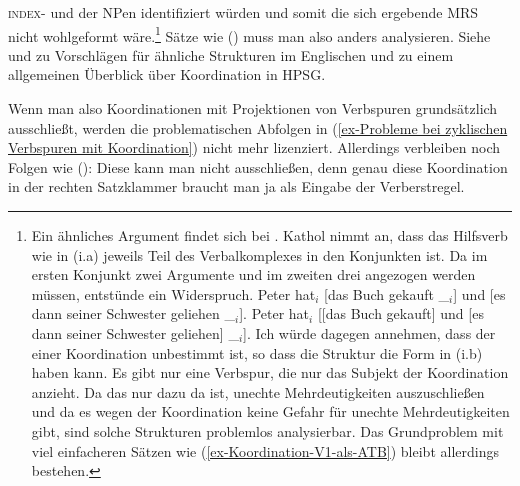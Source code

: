 \textsc{index}- und \ltopwe der NPen identifiziert würden und somit die sich ergebende MRS nicht wohlgeformt wäre.\footnote{%
  Ein ähnliches Argument findet sich bei \citet[75]{Kathol2000a}. Kathol nimmt an, dass das
  Hilfsverb wie in (i.a) jeweils Teil des Verbalkomplexes in den Konjunkten ist. Da im ersten
  Konjunkt zwei Argumente und im zweiten drei angezogen werden müssen, entstünde ein Widerspruch.
\eal
\ex Peter hat$_i$ [das Buch gekauft \_$_i$] und [es dann seiner Schwester geliehen \_$_i$].
\ex Peter hat$_i$ [[das Buch gekauft] und [es dann seiner Schwester geliehen] \_$_i$].
\zl
Ich würde dagegen annehmen, dass der \lexw einer Koordination unbestimmt ist, so dass die Struktur
die Form in (i.b) haben kann. Es gibt nur eine Verbspur, die nur das Subjekt der Koordination
anzieht. Da das \lexm nur dazu da ist, unechte Mehrdeutigkeiten auszuschließen und da es wegen der
Koordination keine Gefahr für unechte Mehrdeutigkeiten gibt, sind solche Strukturen problemlos
analysierbar. Das Grundproblem mit viel einfacheren Sätzen wie (\ref{ex-Koordination-V1-als-ATB}) bleibt allerdings bestehen.
} Sätze wie
() muss man also anders analysieren. Siehe  und  zu Vorschlägen für
ähnliche Strukturen im Englischen und  zu einem allgemeinen Überblick über
Koordination in HPSG.

Wenn man also Koordinationen mit Projektionen von Verbspuren grundsätzlich ausschließt, werden die
problematischen Abfolgen in (\ref{ex-Probleme bei zyklischen Verbspuren mit Koordination}) nicht
mehr lizenziert. Allerdings verbleiben noch Folgen wie ():
\z
Diese kann man nicht ausschließen, denn genau diese Koordination in der rechten Satzklammer braucht
man ja als Eingabe der Verberstregel.


